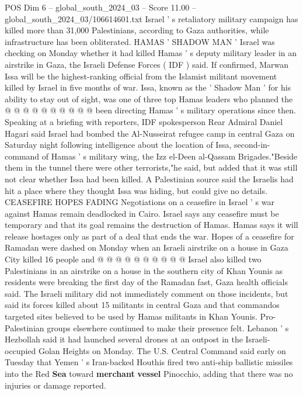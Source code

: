 \begin{textsample}{POS Dim 6 – global\_south\_2024\_03 – Score 11.00 – global\_south\_2024\_03/106614601.txt}
Israel ' s retaliatory military campaign has killed more than 31,000 Palestinians, according to Gaza authorities, while infrastructure has been obliterated.
HAMAS ' SHADOW MAN ' Israel was checking on Monday whether it had killed Hamas ' s deputy military leader in an airstrike in Gaza, the Israeli Defense Forces ( IDF ) said.
If confirmed, Marwan Issa will be the highest-ranking official from the Islamist militant movement killed by Israel in five months of war.
Issa, known as the ' Shadow Man ' for his ability to stay out of sight, was one of three top Hamas leaders who planned the @ @ @ @ @ @ @ @ @ @ been directing Hamas ' s military operations since then.
Speaking at a briefing with reporters, IDF spokesperson Rear Admiral Daniel Hagari said Israel had bombed the Al-Nusseirat refugee camp in central Gaza on Saturday night following intelligence about the location of Issa, second-in-command of Hamas ' s military wing, the Izz el-Deen al-Qassam Brigades."Beside them in the tunnel there were other terrorists,"he said, but added that it was still not clear whether Issa had been killed.
A Palestinian source said the Israelis had hit a place where they thought Issa was hiding, but could give no details.
CEASEFIRE HOPES FADING Negotiations on a ceasefire in Israel ' s war against Hamas remain deadlocked in Cairo.
Israel says any ceasefire must be temporary and that its goal remains the destruction of Hamas.
Hamas says it will release hostages only as part of a deal that ends the war.
Hopes of a ceasefire for Ramadan were dashed on Monday when an Israeli airstrike on a house in Gaza City killed 16 people and @ @ @ @ @ @ @ @ @ @ Israel also killed two Palestinians in an airstrike on a house in the southern city of Khan Younis as residents were breaking the first day of the Ramadan fast, Gaza health officials said.
The Israeli military did not immediately comment on those incidents, but said its forces killed about 15 militants in central Gaza and that commandos targeted sites believed to be used by Hamas militants in Khan Younis.
Pro-Palestinian groups elsewhere continued to make their presence felt.
Lebanon ' s Hezbollah said it had launched several drones at an outpost in the Israeli-occupied Golan Heights on Monday.
The U.S.
Central Command said early on Tuesday that Yemen ' s Iran-backed Houthis fired two anti-ship ballistic missiles into the Red \textbf{Sea} toward \textbf{merchant} \textbf{vessel} Pinocchio, adding that there was no injuries or damage reported.

\end{textsample}
